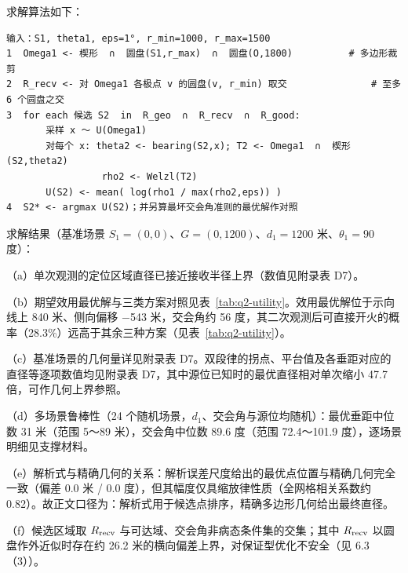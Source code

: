 \documentclass[12pt,a4paper]{ctexart}
\begin{document}
求解算法如下：

\begin{lstlisting}[style=codeblock]
输入：S1, theta1, eps=1°, r_min=1000, r_max=1500
1  Omega1 <- 楔形  ∩  圆盘(S1,r_max)  ∩  圆盘(O,1800)          # 多边形裁剪
2  R_recv <- 对 Omega1 各极点 v 的圆盘(v, r_min) 取交               # 至多 6 个圆盘之交
3  for each 候选 S2  in  R_geo  ∩  R_recv  ∩  R_good:
       采样 x ～ U(Omega1)
       对每个 x: theta2 <- bearing(S2,x); T2 <- Omega1  ∩  楔形(S2,theta2)
                 rho2 <- Welzl(T2)
       U(S2) <- mean( log(rho1 / max(rho2,eps)) )
4  S2* <- argmax U(S2)；并另算最坏交会角准则的最优解作对照
\end{lstlisting}

求解结果（基准场景 $S_1=(0,0)$、$G=(0,1200)$、$d_1=1200$ 米、$\theta_1=90$ 度）：

（a）单次观测的定位区域直径已接近接收半径上界（数值见附录表 D7）。

（b）期望效用最优解与三类方案对照见表~\ref{tab:q2-utility}。效用最优解位于示向线上 840 米、侧向偏移 $-$543 米，交会角约 56 度，其二次观测后可直接开火的概率（28.3\%）远高于其余三种方案（见表~\ref{tab:q2-utility}）。

（c）基准场景的几何量详见附录表 D7。双段律的拐点、平台值及各垂距对应的直径等逐项数值均见附录表 D7，其中源位已知时的最优直径相对单次缩小 47.7 倍，可作几何上界参照。

（d）多场景鲁棒性（24 个随机场景，$d_1$、交会角与源位均随机）：最优垂距中位数 31 米（范围 5～89 米），交会角中位数 89.6 度（范围 72.4～101.9 度），逐场景明细见支撑材料。

（e）解析式与精确几何的关系：解析误差尺度给出的最优点位置与精确几何完全一致（偏差 0.0 米 / 0.0 度），但其幅度仅具缩放律性质（全网格相关系数约 0.82）。故正文口径为：解析式用于候选点排序，精确多边形几何给出最终直径。

（f）候选区域取 $R_{\rm recv}$ 与可达域、交会角非病态条件集的交集；其中 $R_{\rm recv}$ 以圆盘作外近似时存在约 26.2 米的横向偏差上界，对保证型优化不安全（见 6.3（3））。

\begin{table}[htbp]
\centering
\caption{四类选点方案的后验几何收缩效用对比}\label{tab:q2-utility}
{}
\end{table}
\end{document}
